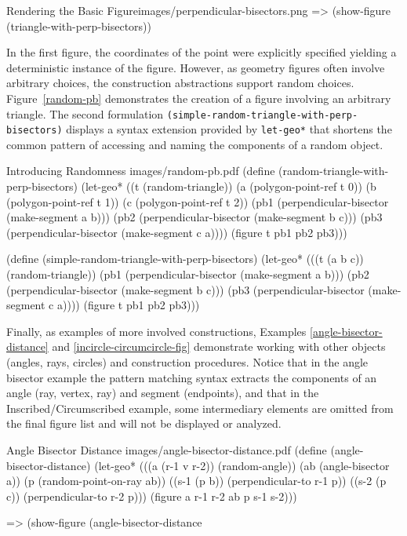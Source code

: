 \begin{img-example}
[label=perp-show-figure]
{Rendering the Basic Figure}{images/perpendicular-bisectors.png}
=> (show-figure (triangle-with-perp-bisectors))
\end{img-example}

In the first figure, the coordinates of the point were explicitly
specified yielding a deterministic instance of the figure. However, as
geometry figures often involve arbitrary choices, the construction
abstractions support random choices. Figure~\ref{random-pb}
demonstrates the creation of a figure involving an arbitrary
triangle. The second formulation
\texttt{(simple-random-triangle-with-perp-bisectors)} displays a
syntax extension provided by \texttt{let-geo*} that shortens the
common pattern of accessing and naming the components of a random
object.

\begin{pdf-example}
[label=random-pb]
{Introducing Randomness}
{images/random-pb.pdf}
(define (random-triangle-with-perp-bisectors)
  (let-geo* ((t (random-triangle))
             (a (polygon-point-ref t 0))
             (b (polygon-point-ref t 1))
             (c (polygon-point-ref t 2))
             (pb1 (perpendicular-bisector (make-segment a b)))
             (pb2 (perpendicular-bisector (make-segment b c)))
             (pb3 (perpendicular-bisector (make-segment c a))))
    (figure t pb1 pb2 pb3)))

(define (simple-random-triangle-with-perp-bisectors)
  (let-geo* (((t (a b c)) (random-triangle))
             (pb1 (perpendicular-bisector (make-segment a b)))
             (pb2 (perpendicular-bisector (make-segment b c)))
             (pb3 (perpendicular-bisector (make-segment c a))))
    (figure t pb1 pb2 pb3)))
\end{pdf-example}

Finally, as examples of more involved constructions, Examples
\ref{angle-bisector-distance} and \ref{incircle-circumcircle-fig}
demonstrate working with other objects (angles, rays, circles) and
construction procedures. Notice that in the angle bisector example
the pattern matching syntax extracts the components of an angle (ray,
vertex, ray) and segment (endpoints), and that in the
Inscribed/Circumscribed example, some intermediary elements are
omitted from the final figure list and will not be displayed or
analyzed.

\begin{pdf-example}
[label=angle-bisector-distance]
{Angle Bisector Distance}
{images/angle-bisector-distance.pdf}
(define (angle-bisector-distance)
  (let-geo* (((a (r-1 v r-2)) (random-angle))
             (ab (angle-bisector a))
             (p (random-point-on-ray ab))
             ((s-1 (p b)) (perpendicular-to r-1 p))
             ((s-2 (p c)) (perpendicular-to r-2 p)))
     (figure a r-1 r-2 ab p s-1 s-2)))

=> (show-figure (angle-bisector-distance
\end{pdf-example}

